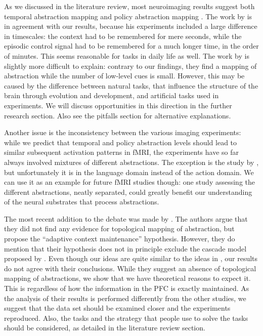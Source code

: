 \documentclass[10pt,a4paper]{report}
\begin{document}
As we discussed in the literature review, most neuroimaging results suggest both temporal abstraction mapping and policy abstraction mapping \citep{Badre2009}. The work by \citet{Koechlin2003} is in agreement with our results, because his experiments included a large difference in timescales: the context had to be remembered for mere seconds, while the episodic control signal had to be remembered for a much longer time, in the order of minutes. This seems reasonable for tasks in daily life as well. The work by \citet{Badre2007} is slightly more difficult to explain: contrary to our findings, they find a mapping of abstraction while the number of low-level cues is small. However, this may be caused by the difference between natural tasks, that influence the structure of the brain through evolution and development, and artificial tasks used in experiments. We will discuss opportunities in this direction in the further research section. Also see the pitfalls section for alternative explanations. 

Another issue is the inconsistency between the various imaging experiments: while we predict that temporal and policy abstraction levels should lead to similar subsequent activation patterns in fMRI, the experiments have so far always involved mixtures of different abstractions. The exception is the study by \citet{Christoff2009}, but unfortunately it is in the language domain instead of the action domain. We can use it as an example for future fMRI studies though: one study assessing the different abstractions, neatly separated, could greatly benefit our understanding of the neural substrates that process abstractions. 

The most recent addition to the debate was made by \citet{Reynolds2012}. The authors argue that they did not find any evidence for topological mapping of abstraction, but propose the ``adaptive context maintenance'' hypothesis. However, they do mention that their hypothesis does not in principle exclude the cascade model proposed by \citet{Koechlin2003}. Even though our ideas are quite similar to the ideas in \citet{Reynolds2012}, our results do not agree with their conclusions. While they suggest an absence of topological mapping of abstractions, we show that we have theoretical reasons to expect it. This is regardless of how the information in the PFC is exactly maintained. As the analysis of their results is performed differently from the other studies, we suggest that the data set should be examined closer and the experiments reproduced. Also, the tasks and the strategy that people use to solve the tasks should be considered, as detailed in the literature review section.
\end{document}

